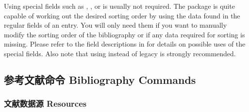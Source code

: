 Using special fields such as , , or  is usually not required. The \biblatex package is quite capable of working out the desired sorting order by using the data found in the regular fields of an entry. You will only need them if you want to manually modify the sorting order of the bibliography or if any data required for sorting is missing. Please refer to the field descriptions in  for details on possible uses of the special fields. Also note that using \biber instead of legacy \bibtex is strongly recommended.

\subsection{参考文献命令 Bibliography Commands}
\label{use:bib}

\subsubsection{文献数据源 Resources}
\label{use:bib:res}

